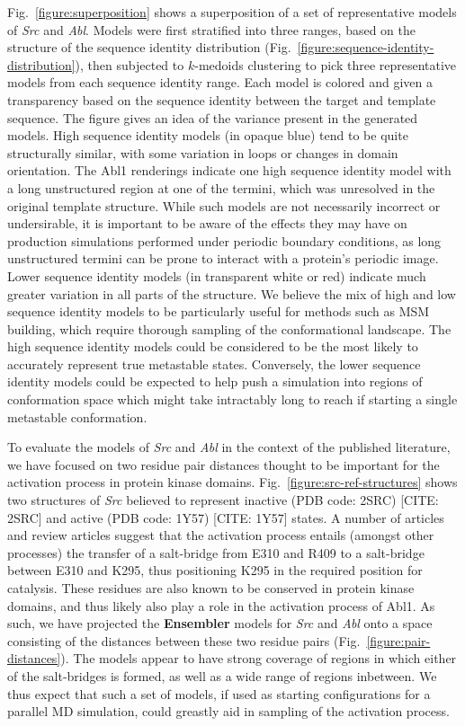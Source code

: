 \documentclass[aps,pre,twocolumn,nofootinbib,superscriptaddress,linenumbers]{revtex4-1}
\begin{document}
Fig.~\ref{figure:superposition} shows a superposition of a set of representative models of \emph{Src} and \emph{Abl}.
Models were first stratified into three ranges, based on the structure of the sequence identity distribution (Fig.~\ref{figure:sequence-identity-distribution}), then subjected to $k$-medoids clustering to pick three representative models from each sequence identity range.
Each model is colored and given a transparency based on the sequence identity between the target and template sequence.
The figure gives an idea of the variance present in the generated models.
High sequence identity models (in opaque blue) tend to be quite structurally similar, with some variation in loops or changes in domain orientation.
The Abl1 renderings indicate one high sequence identity model with a long unstructured region at one of the termini, which was unresolved in the original template structure.
While such models are not necessarily incorrect or undersirable, it is important to be aware of the effects they may have on production simulations performed under periodic boundary conditions, as long unstructured termini can be prone to interact with a protein's periodic image.
Lower sequence identity models (in transparent white or red) indicate much greater variation in all parts of the structure.
We believe the mix of high and low sequence identity models to be particularly useful for methods such as MSM building, which require thorough sampling of the conformational landscape.
The high sequence identity models could be considered to be the most likely to accurately represent true metastable states.
Conversely, the lower sequence identity models could be expected to help push a simulation into regions of conformation space which might take intractably long to reach if starting a single metastable conformation.

To evaluate the models of \emph{Src} and \emph{Abl} in the context of the published literature, we have focused on two residue pair distances thought to be important for the activation process in protein kinase domains.
Fig.~\ref{figure:src-ref-structures} shows two structures of \emph{Src} believed to represent inactive (PDB code: 2SRC) {\color{red}[CITE: 2SRC]} and active (PDB code: 1Y57) {\color{red}[CITE: 1Y57]} states.
A number of articles and review articles suggest that the activation process entails (amongst other processes) the transfer of a salt-bridge from E310 and R409 to a salt-bridge between E310 and K295, thus positioning K295 in the required position for catalysis. %
These residues are also known to be conserved in protein kinase domains, %
and thus likely also play a role in the activation process of Abl1. %
As such, we have projected the {\bf Ensembler} models for \emph{Src} and \emph{Abl} onto a space consisting of the distances between these two residue pairs (Fig.~\ref{figure:pair-distances}).
The models appear to have strong coverage of regions in which either of the salt-bridges is formed, as well as a wide range of regions inbetween.
We thus expect that such a set of models, if used as starting configurations for a parallel MD simulation, could greastly aid in sampling of the activation process.
\end{document}
